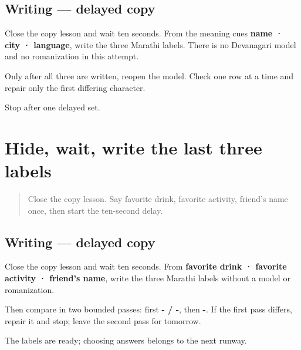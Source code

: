 \subsection*{Writing — delayed copy}
Close the copy lesson and wait ten seconds. From the meaning cues \textbf{name · city · language}, write the three Marathi labels. There is no Devanagari model and no romanization in this attempt.

Only after all three are written, reopen the model. Check one row at a time and repair only the first differing character.

\begin{tcolorbox}[breakable,colback=teal!4,colframe=teal!35!black,title={Before you move on}]
Stop after one delayed set.
\end{tcolorbox}
\section[āvaḍte pey · āvaḍtī kṛtī · mitrāce nāv]{Hide, wait, write the last three labels}

\label{lesson:MR-A1F03-last-three-delayed}



\begin{quote}
Close the copy lesson. Say favorite drink, favorite activity, friend's name once, then start the ten-second delay.
\end{quote}

\subsection*{Writing — delayed copy}
Close the copy lesson and wait ten seconds. From \textbf{favorite drink · favorite activity · friend's name}, write the three Marathi labels without a model or romanization.

Then compare in two bounded passes: first \textbf{- / -}, then \textbf{-}. If the first pass differs, repair it and stop; leave the second pass for tomorrow.

\begin{tcolorbox}[breakable,colback=teal!4,colframe=teal!35!black,title={Before you move on}]
The labels are ready; choosing answers belongs to the next runway.
\end{tcolorbox}
